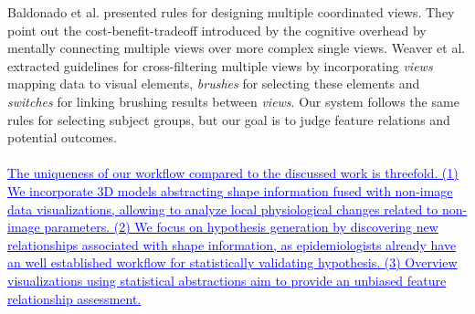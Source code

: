 \documentclass[journal]{style/vgtc} 			          %
\newcommand{\add}[1]{\textcolor{blue}{\uline{#1}}}
\begin{document}
Baldonado et al. \cite{Baldonado2000} presented rules for designing multiple coordinated views.
%
They point out the cost-benefit-tradeoff introduced by the cognitive overhead by mentally connecting multiple views over more complex single views. %
%
Weaver et al. \cite{Weaver2010} extracted guidelines for cross-filtering multiple views by incorporating \emph{views} mapping data to visual elements, \emph{brushes} for selecting these elements and \emph{switches} for linking brushing results between \emph{views}.
%
Our system follows the same rules for selecting subject groups, but our goal is to judge feature relations and potential outcomes.
\\\\
\add{%
The uniqueness of our workflow compared to the discussed work is threefold.
%
(1) We incorporate 3D models abstracting shape information fused with non-image data visualizations, allowing to analyze local physiological changes related to non-image parameters.
%
(2) We focus on hypothesis generation by discovering new relationships associated with shape information, as epidemiologists already have an well established workflow for statistically validating hypothesis.
%
(3) Overview visualizations using statistical abstractions aim to provide an unbiased feature relationship assessment.
}

\end{document}
